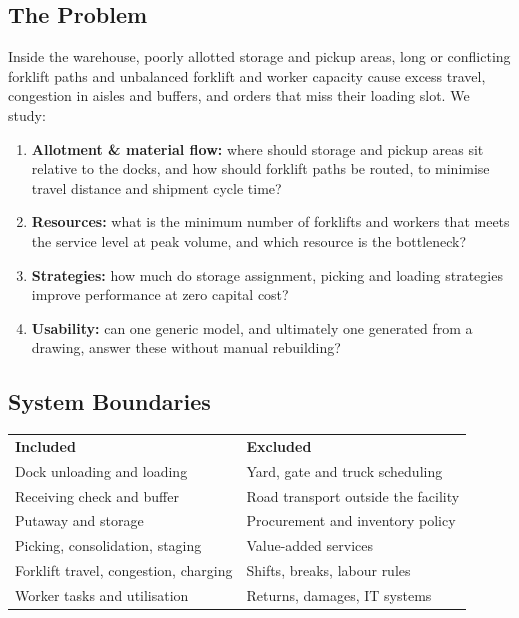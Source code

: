 \documentclass[10pt]{selfArx}
\begin{document}
\subsection*{The Problem}
Inside the warehouse, poorly allotted storage and pickup areas, long or conflicting forklift paths and unbalanced forklift and worker capacity cause excess travel, congestion in aisles and buffers, and orders that miss their loading slot. We study:
\begin{enumerate}
  \item \textbf{Allotment \& material flow:} where should storage and pickup areas sit relative to the docks, and how should forklift paths be routed, to minimise travel distance and shipment cycle time?
  \item \textbf{Resources:} what is the minimum number of forklifts and workers that meets the service level at peak volume, and which resource is the bottleneck?
  \item \textbf{Strategies:} how much do storage assignment, picking and loading strategies improve performance at zero capital cost?
  \item \textbf{Usability:} can one generic model, and ultimately one generated from a drawing, answer these without manual rebuilding?
\end{enumerate}
\subsection*{System Boundaries}
{\footnotesize
\renewcommand{\arraystretch}{1.05}
\setlength{\tabcolsep}{3pt}
\noindent\begin{tabularx}{\columnwidth}{LL}
 \textbf{Included} & \textbf{Excluded} \\
Dock unloading and loading & Yard, gate and truck scheduling \\
Receiving check and buffer & Road transport outside the facility \\
Putaway and storage & Procurement and inventory policy \\
Picking, consolidation, staging & Value-added services \\
Forklift travel, congestion, charging & Shifts, breaks, labour rules \\
Worker tasks and utilisation & Returns, damages, IT systems \\
\end{tabularx}}



\end{document}

